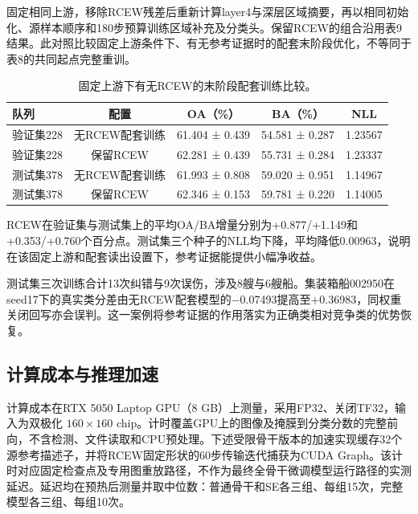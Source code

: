 \documentclass[journal,10pt,a4paper]{IEEEtran}
\begin{document}
固定相同上游，移除RCEW残差后重新计算layer4与深层区域摘要，再以相同初始化、源样本顺序和180步预算训练区域补充及分类头。保留RCEW的组合沿用表9结果。此对照比较固定上游条件下、有无参考证据时的配套末阶段优化，不等同于表8的共同起点完整重训。

\begin{table}[!t]
\centering\footnotesize
\setcounter{table}{11}
\caption{固定上游下有无RCEW的末阶段配套训练比较。}
\label{tab:12}
\setlength{\tabcolsep}{3pt}\renewcommand{\arraystretch}{1.2}
\begin{tabularx}{\linewidth}{LCCCC}
\toprule
队列 & 配置 & OA（\%） & BA（\%） & NLL \\
\midrule
验证集228 & 无RCEW配套训练 & 61.404 ± 0.439 & 54.581 ± 0.287 & 1.23567 \\
验证集228 & 保留RCEW & 62.281 ± 0.439 & 55.731 ± 0.284 & 1.23337 \\
测试集378 & 无RCEW配套训练 & 61.993 ± 0.808 & 59.020 ± 0.951 & 1.14967 \\
测试集378 & 保留RCEW & 62.346 ± 0.153 & 59.781 ± 0.220 & 1.14005 \\
\bottomrule
\end{tabularx}
\end{table}

RCEW在验证集与测试集上的平均OA/BA增量分别为+0.877/+1.149和+0.353/+0.760个百分点。测试集三个种子的NLL均下降，平均降低0.00963，说明在该固定上游和配套读出设置下，参考证据能提供小幅净收益。

测试集三次训练合计13次纠错与9次误伤，涉及8艘与6艘船。集装箱船002950在seed17下的真实类分差由无RCEW配套模型的−0.07493提高至+0.36983，同权重关闭回写亦会误判。这一案例将参考证据的作用落实为正确类相对竞争类的优势恢复。

\subsection{计算成本与推理加速}\label{ux8ba1ux7b97ux6210ux672cux4e0eux63a8ux7406ux52a0ux901f}

计算成本在RTX 5050 Laptop GPU（8 GB）上测量，采用FP32、关闭TF32，输入为双极化 \(160\times160\) chip。计时覆盖GPU上的图像及掩膜到分类分数的完整前向，不含检测、文件读取和CPU预处理。下述受限骨干版本的加速实现缓存32个源参考描述子，并将RCEW固定形状的60步传输迭代捕获为CUDA Graph。该计时对应固定检查点及专用图重放路径，不作为最终全骨干微调模型运行路径的实测延迟。延迟均在预热后测量并取中位数：普通骨干和SE各三组、每组15次，完整模型各三组、每组10次。
\end{document}
